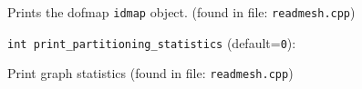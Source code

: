 Prints the dofmap  \verb+idmap+  object. 
 (found in file: \verb+readmesh.cpp+)
\item\verb+int print_partitioning_statistics+ {\rm(default=\verb|0|)}:

Print graph statistics
 (found in file: \verb+readmesh.cpp+)
